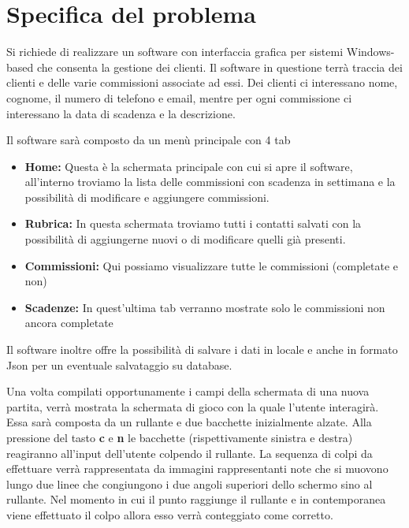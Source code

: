 \section{Specifica del problema}
Si richiede di realizzare un software con interfaccia grafica per sistemi Windows-based che consenta la gestione dei clienti. Il software in questione terrà traccia dei clienti e delle varie commissioni
associate ad essi. Dei clienti ci interessano nome, cognome, il numero di telefono e email, mentre per ogni commissione ci interessano
la data di scadenza e la descrizione.

Il software sarà composto da un menù principale con 4 tab 
\begin{itemize}
        \item \textbf{Home:} Questa è la schermata principale con cui si apre il software, all'interno
        troviamo la lista delle commissioni con scadenza in settimana e la possibilità di modificare
        e aggiungere commissioni.
        \item \textbf{Rubrica:} In questa schermata troviamo tutti i contatti %
        salvati con la possibilità di aggiungerne nuovi o di modificare quelli già presenti. %
        \item \textbf{Commissioni:} Qui possiamo visualizzare tutte le commissioni (completate e non)
        \item \textbf{Scadenze:} In quest'ultima tab verranno mostrate solo le commissioni non ancora completate %
\end{itemize}


\medskip
Il software inoltre offre la possibilità di salvare i dati in locale e anche in formato Json per un eventuale
salvataggio su database.



Una volta compilati opportunamente i campi della schermata di una nuova partita, verrà mostrata la schermata di gioco con la quale l'utente interagirà.
Essa sarà composta da un rullante e due bacchette inizialmente alzate. Alla pressione del tasto \textbf{c} e \textbf{n} le bacchette (rispettivamente sinistra e destra) reagiranno all'input dell'utente colpendo il rullante.
La sequenza di colpi da effettuare verrà rappresentata da immagini rappresentanti note che si muovono lungo due linee che congiungono i due angoli superiori dello schermo sino al rullante.
Nel momento in cui il punto raggiunge il rullante e in contemporanea viene effettuato il colpo allora esso verrà conteggiato come corretto.

